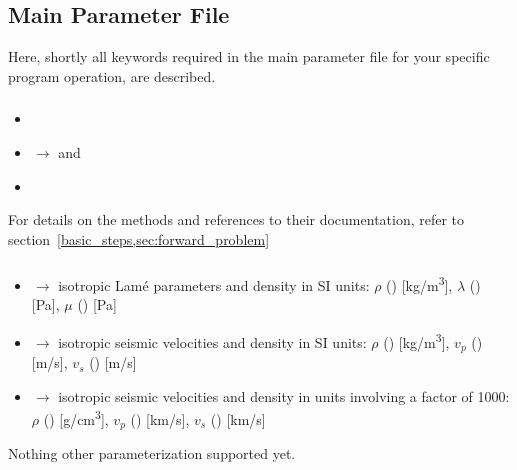 \subsection{Main Parameter File} \label{files,sec:main_parfile}
%
Here, shortly all keywords required in the main parameter file for your specific program operation, are described.
\subsubsection{} \label{files,sec:main_parfile,itm:forward_method}
\begin{itemize}
\item[] 
\item[]  $\rightarrow$  and 
\item[]  
\end{itemize}
For details on the methods and references to their documentation, refer to section~\ref{basic_steps,sec:forward_problem}
\subsubsection{} \label{files,sec:main_parfile,itm:mod_pmtrz}
\begin{itemize}
\item[]  $\rightarrow$ isotropic Lam\'e parameters and density in SI units: 
    $\rho$ () [kg/m\textsuperscript{3}], $\lambda$ () [Pa], $\mu$ ()  [Pa]
\item[]  $\rightarrow$ isotropic seismic velocities and density in SI units:
    $\rho$ () [kg/m\textsuperscript{3}], $v_p$ () [m/s], $v_s$ () [m/s]
\item[]  $\rightarrow$ isotropic seismic velocities and density in  
  units involving a factor of 1000: $\rho$ () [g/cm\textsuperscript{3}], $v_p$ () [km/s], 
  $v_s$ () [km/s]
\end{itemize}
Nothing other parameterization supported yet.
